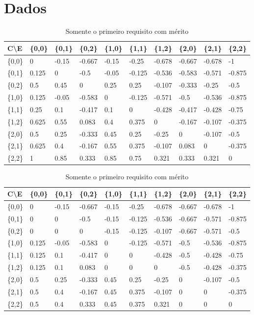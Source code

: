 \documentclass[preprint,12pt]{elsarticle}
\begin{document}
\section{Dados}
\begin{table}[h]
\caption{Todos os requisitos com mérito}
\label{table:merit-1-all}
\centering
\begin{tabular}{@{}llllllllll@{}}
\toprule
C\textbackslash E & \{0,0\} & \{0,1\} & \{0,2\} & \{1,0\} & \{1,1\} & \{1,2\} & \{2,0\} & \{2,1\} & \{2,2\} \\ \midrule
\{0,0\} & 0 & -0.15 & -0.667 & -0.15 & -0.25 & -0.678 & -0.667 & -0.678 & -1 \\
\{0,1\} & 0.125 & 0 & -0.5 & -0.05 & -0.125 & -0.536 & -0.583 & -0.571 & -0.875 \\
\{0,2\} & 0.5 & 0.45 & 0 & 0.25 & 0.25 & -0.107 & -0.333 & -0.25 & -0.5 \\
\{1,0\} & 0.125 & -0.05 & -0.583 & 0 & -0.125 & -0.571 & -0.5 & -0.536 & -0.875 \\
\{1,1\} & 0.25 & 0.1 & -0.417 & 0.1 & 0 & -0.428 & -0.417 & -0.428 & -0.75 \\
\{1,2\} & 0.625 & 0.55 & 0.083 & 0.4 & 0.375 & 0 & -0.167 & -0.107 & -0.375 \\
\{2,0\} & 0.5 & 0.25 & -0.333 & 0.45 & 0.25 & -0.25 & 0 & -0.107 & -0.5 \\
\{2,1\} & 0.625 & 0.4 & -0.167 & 0.55 & 0.375 & -0.107 & 0.083 & 0 & -0.375 \\
\{2,2\} & 1 & 0.85 & 0.333 & 0.85 & 0.75 & 0.321 & 0.333 & 0.321 & 0 \\
\bottomrule
\end{tabular}

\caption{Somente o primeiro requisito com mérito}
\label{table:merit-0-and-1}
\begin{tabular}{@{}llllllllll@{}}
\toprule
C\textbackslash E & \{0,0\} & \{0,1\} & \{0,2\} & \{1,0\} & \{1,1\} & \{1,2\} & \{2,0\} & \{2,1\} & \{2,2\} \\ \midrule
\{0,0\} & 0 & -0.15 & -0.667 & -0.15 & -0.25 & -0.678 & -0.667 & -0.678 & -1 \\
\{0,1\} & 0 & 0 & -0.5 & -0.15 & -0.125 & -0.536 & -0.667 & -0.571 & -0.875 \\
\{0,2\} & 0 & 0 & 0 & -0.15 & -0.125 & -0.107 & -0.667 & -0.571 & -0.5 \\
\{1,0\} & 0.125 & -0.05 & -0.583 & 0 & -0.125 & -0.571 & -0.5 & -0.536 & -0.875 \\
\{1,1\} & 0.125 & 0.1 & -0.417 & 0 & 0 & -0.428 & -0.5 & -0.428 & -0.75 \\
\{1,2\} & 0.125 & 0.1 & 0.083 & 0 & 0 & 0 & -0.5 & -0.428 & -0.375 \\
\{2,0\} & 0.5 & 0.25 & -0.333 & 0.45 & 0.25 & -0.25 & 0 & -0.107 & -0.5 \\
\{2,1\} & 0.5 & 0.4 & -0.167 & 0.45 & 0.375 & -0.107 & 0 & 0 & -0.375 \\
\{2,2\} & 0.5 & 0.4 & 0.333 & 0.45 & 0.375 & 0.321 & 0 & 0 & 0 \\ \bottomrule
\end{tabular}


\end{table}
\end{document}
